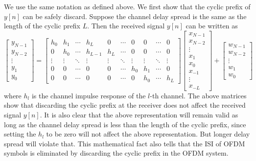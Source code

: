 We use the same notation as defined above. We first show that the cyclic prefix of $y[n]$ can be safely discard. Suppose the channel delay spread is the same as the length of the cyclic prefix $L$. Then the received signal $y[n]$ can be written as
\begin{equation}
    \label{eq:circ_conv}
    \begin{bmatrix}
        y_{N-1} \\ y_{N-2} \\ \vdots \\ y_1 \\ y_0
    \end{bmatrix}
    =
    \begin{bmatrix}
        h_0 & h_1 & \cdots & h_{L} & 0 & \cdots & 0 & 0 & \cdots & 0 \\
        0 & h_0 & \cdots & h_{L-1} & h_{L} & \cdots & 0 & 0 & \cdots & 0 \\
        \vdots & \vdots & \ddots & \vdots & \vdots & \ddots & \vdots & \vdots & \ddots & \vdots \\
        0 & 0 & \cdots & 0 & 0 & \cdots & h_0 & h_1 & \cdots & 0 \\
        0 & 0 & \cdots & 0 & 0 & \cdots & 0 & h_0 & \cdots & h_{L}
    \end{bmatrix}
    \begin{bmatrix}
        x_{N-1} \\ x_{N-2} \\ \vdots \\ x_1 \\ x_0 \\ x_{-1} \\ \vdots \\ x_{-L}
    \end{bmatrix}
    +
    \begin{bmatrix}
        w_{N-1} \\ w_{N-2} \\ \vdots \\ w_1 \\ w_0
    \end{bmatrix}
\end{equation}
where $h_l$ is the channel impulse response of the $l$-th channel. The above matrices show that discarding the cyclic prefix at the receiver does not affect the received signal $y[n]$. It is also clear that the above representation will remain valid as long as the channel delay spread is less than the length of the cyclic prefix, since setting the $h_l$ to be zero will not affect the above representation. But longer delay spread will violate that. This mathematical fact also tells that the ISI of OFDM symbols is eliminated by discarding the cyclic prefix in the OFDM system.


